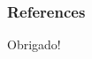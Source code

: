 \documentclass{beamer}
\begin{document}

\begin{frame}
\frametitle{References}
        
        
\end{frame}


\begin{frame}
\Huge{\centerline{Obrigado!}}
\end{frame}

\end{document}
